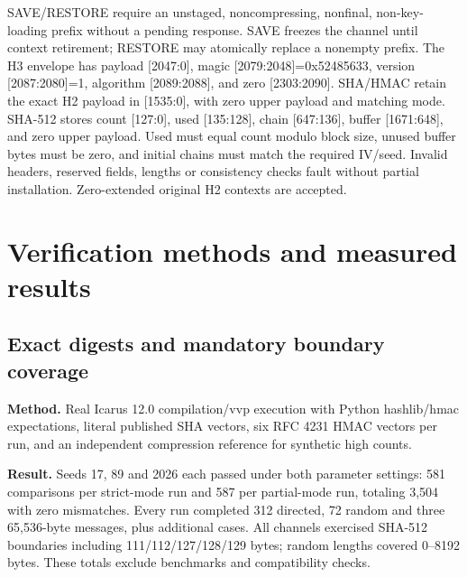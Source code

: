\documentclass[11pt,a4paper]{article}
\begin{document}
SAVE/\allowbreak{}RESTORE require an unstaged,\allowbreak{} noncompressing,\allowbreak{} nonfinal,\allowbreak{} non-key-loading prefix without a pending response. SAVE freezes the channel until context retirement; RESTORE may atomically replace a nonempty prefix. The H3 envelope has payload [\allowbreak{}2047:0]\allowbreak{},\allowbreak{} magic [\allowbreak{}2079:2048]\allowbreak{}=\allowbreak{}0x52485633,\allowbreak{} version [\allowbreak{}2087:2080]\allowbreak{}=\allowbreak{}1,\allowbreak{} algorithm [\allowbreak{}2089:2088]\allowbreak{},\allowbreak{} and zero [\allowbreak{}2303:2090]\allowbreak{}. SHA/\allowbreak{}HMAC retain the exact H2 payload in [\allowbreak{}1535:0]\allowbreak{},\allowbreak{} with zero upper payload and matching mode. SHA-512 stores count [\allowbreak{}127:0]\allowbreak{},\allowbreak{} used [\allowbreak{}135:128]\allowbreak{},\allowbreak{} chain [\allowbreak{}647:136]\allowbreak{},\allowbreak{} buffer [\allowbreak{}1671:648]\allowbreak{},\allowbreak{} and zero upper payload. Used must equal count modulo block size,\allowbreak{} unused buffer bytes must be zero,\allowbreak{} and initial chains must match the required IV/\allowbreak{}seed. Invalid headers,\allowbreak{} reserved fields,\allowbreak{} lengths or consistency checks fault without partial installation. Zero-extended original H2 contexts are accepted.

\section{Verification methods and measured results}

\subsection{Exact digests and mandatory boundary coverage}

\textbf{Method.} Real Icarus 12.0 compilation/\allowbreak{}vvp execution with Python hashlib/\allowbreak{}hmac expectations,\allowbreak{} literal published SHA vectors,\allowbreak{} six RFC 4231 HMAC vectors per run,\allowbreak{} and an independent compression reference for synthetic high counts.

\textbf{Result.} Seeds 17,\allowbreak{} 89 and 2026 each passed under both parameter settings: 581 comparisons per strict-mode run and 587 per partial-mode run,\allowbreak{} totaling 3,\allowbreak{}504 with zero mismatches. Every run completed 312 directed,\allowbreak{} 72 random and three 65,\allowbreak{}536-byte messages,\allowbreak{} plus additional cases. All channels exercised SHA-512 boundaries including 111/\allowbreak{}112/\allowbreak{}127/\allowbreak{}128/\allowbreak{}129 bytes; random lengths covered 0–8192 bytes. These totals exclude benchmarks and compatibility checks.
\end{document}

